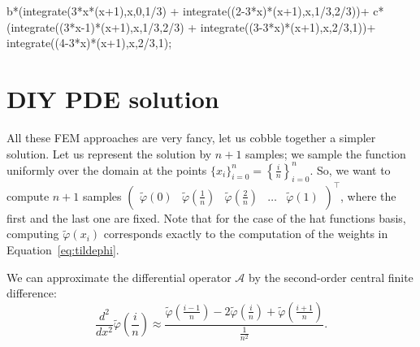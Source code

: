 \documentclass[notitlepage,oneside]{book}
\begin{document}



b*(integrate(3*x*(x+1),x,0,1/3) + integrate((2-3*x)*(x+1),x,1/3,2/3))+ c*(integrate((3*x-1)*(x+1),x,1/3,2/3) + integrate((3-3*x)*(x+1),x,2/3,1))+ integrate((4-3*x)*(x+1),x,2/3,1);
\fi

\section{DIY PDE solution}
All these FEM approaches are very fancy, let us cobble together a simpler solution.
Let us represent the solution by $n+1$ samples; we sample the function uniformly over the domain at the points $\{x_i\}_{i=0}^n = \left\{\frac{i}{n}\right\}_{i=0}^n$.
So, we want to compute $n+1$ samples $\begin{pmatrix}\tilde\varphi(0) & \tilde\varphi\left(\frac{1}{n}\right) & \tilde\varphi\left(\frac{2}{n}\right) & \dots &\tilde\varphi(1) \end{pmatrix}^\top$, where the first and the last one are fixed.
Note that for the case of the hat functions basis, computing $\tilde\varphi(x_i)$ corresponds exactly to the computation of the weights in Equation~\eqref{eq:tildephi}.

We can approximate the differential operator $\mathcal A$ by the second-order central finite difference:
$$\frac{d^2}{dx^2}\tilde\varphi\left(\frac{i}{n}\right) \approx \frac{\tilde\varphi\left(\frac{i-1}{n}\right) -2\tilde\varphi\left(\frac{i}{n}\right)+\tilde\varphi\left(\frac{i+1}{n}\right)  }{\frac{1}{n^2}}.$$
\end{document}
